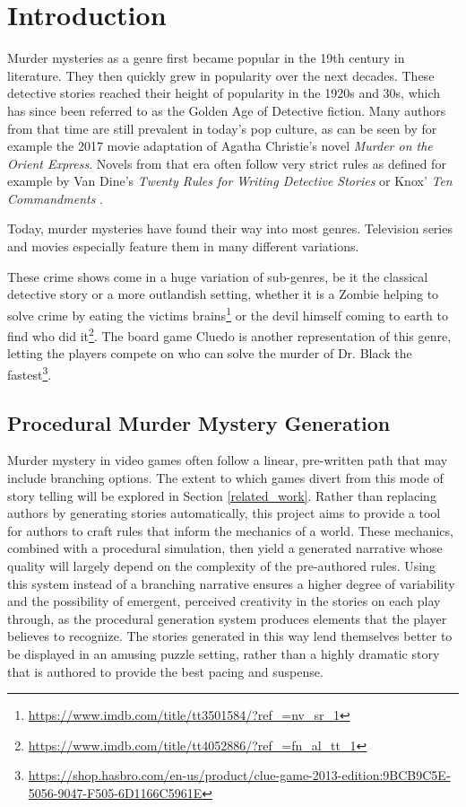 \section{Introduction} \label{introduction}

Murder mysteries as a genre first became popular in the 19th century in literature.
They then quickly grew in popularity over the next decades.
These detective stories reached their height of popularity in the 1920s and 30s, which has since been referred to as the Golden Age of Detective fiction.
Many authors from that time are still prevalent in today's pop culture, as can be seen by for example the 2017 movie adaptation of Agatha Christie's novel \emph{Murder on the Orient Express}.
Novels from that era often follow very strict rules as defined for example by Van Dine's \emph{Twenty Rules for Writing Detective Stories} or Knox' \emph{Ten Commandments} \cite{van_dine_1928, knox_1929}.

Today, murder mysteries have found their way into most genres.
Television series and movies especially feature them in many different variations.

These crime shows come in a huge variation of sub-genres, be it the classical detective story or a more outlandish setting, whether it is a Zombie helping to solve crime by eating the victims brains\footnote{\url{https://www.imdb.com/title/tt3501584/?ref_=nv_sr_1}} or the devil himself coming to earth to find who did it\footnote{\url{https://www.imdb.com/title/tt4052886/?ref_=fn_al_tt_1}}.
The board game Cluedo is another representation of this genre, letting the players compete on who can solve the murder of Dr. Black the fastest\footnote{\url{https://shop.hasbro.com/en-us/product/clue-game-2013-edition:9BCB9C5E-5056-9047-F505-6D1166C5961E}}.

\subsection{Procedural Murder Mystery Generation}
Murder mystery in video games often follow a linear, pre-written path that may include branching options.
The extent to which games divert from this mode of story telling will be explored in Section \ref{related_work}.
Rather than replacing authors by generating stories automatically, this project aims to provide a tool for authors to craft rules that inform the mechanics of a world.
These mechanics, combined with a procedural simulation, then yield a generated narrative whose quality will largely depend on the complexity of the pre-authored rules.
Using this system instead of a branching narrative ensures a higher degree of variability and the possibility of emergent, perceived creativity in the stories on each play through, as the procedural generation system produces elements that the player believes to recognize.
The stories generated in this way lend themselves better to be displayed in an amusing puzzle setting, rather than a highly dramatic story that is authored to provide the best pacing and suspense.


